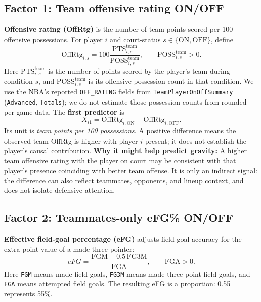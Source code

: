 \documentclass[11pt]{article}
\begin{document}
\subsection{Factor 1: Team offensive rating ON/OFF}
\textbf{Offensive rating (OffRtg)} is the number of team points scored per
100 offensive possessions. For player $i$ and court-status
$s\in\{\mathrm{ON},\mathrm{OFF}\}$, define
\begin{equation}
\mathrm{OffRtg}_{i,s}
=100\frac{\mathrm{PTS}^{\mathrm{team}}_{i,s}}
{\mathrm{POSS}^{\mathrm{team}}_{i,s}},
\qquad \mathrm{POSS}^{\mathrm{team}}_{i,s}>0.
\label{eq:offrtg}
\end{equation}
Here $\mathrm{PTS}^{\mathrm{team}}_{i,s}$ is the number of points scored by
the player's team during condition $s$, and
$\mathrm{POSS}^{\mathrm{team}}_{i,s}$ is its offensive-possession count in
that condition. We use the NBA's reported \texttt{OFF\_RATING} fields from
\texttt{TeamPlayerOnOffSummary} (\texttt{Advanced}, \texttt{Totals});
we do not estimate those possession counts from rounded per-game data.
The \textbf{first predictor} is
\begin{equation}
\boxed{X_{i1}=\mathrm{OffRtg}_{i,\mathrm{ON}}
-\mathrm{OffRtg}_{i,\mathrm{OFF}}.}
\label{eq:offrtg-diff}
\end{equation}
Its unit is \emph{team points per 100 possessions}. A positive difference
means the observed team OffRtg is higher with player $i$ present; it does
not establish the player's causal contribution.
\textbf{Why it might help predict gravity:} A higher team offensive rating
with the player on court may be consistent with that player's presence
coinciding with better team offense. It is only an indirect signal: the
difference can also reflect teammates, opponents, and lineup context, and
does not isolate defensive attention.

\subsection{Factor 2: Teammates-only eFG\% ON/OFF}
\textbf{Effective field-goal percentage (eFG)} adjusts field-goal accuracy
for the extra point value of a made three-pointer:
\begin{equation}
 eFG=\frac{\mathrm{FGM}+0.5\,\mathrm{FG3M}}{\mathrm{FGA}},
 \qquad \mathrm{FGA}>0.
 \label{eq:efg}
\end{equation}
Here \texttt{FGM} means made field goals, \texttt{FG3M} means made
three-point field goals, and \texttt{FGA} means attempted field goals.
The resulting eFG is a proportion: 0.55 represents 55\%.
\end{document}
